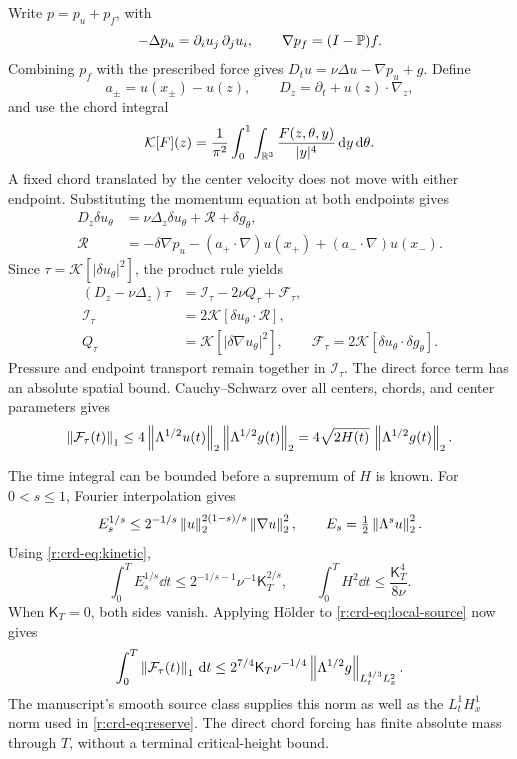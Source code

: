 Write \(p=p_u+p_f\), with
\[
 -\Delta p_u=\partial_i u_j\,\partial_j u_i,\qquad
 \nabla p_f=(I-\mathbb P)f.
\]
Combining \(p_f\) with the prescribed force gives
\(D_tu=\nu\Delta u-\nabla p_u+g\). Define
\[
 a_\pm=u(x_\pm)-u(z),\qquad
 D_z=\partial_t+u(z)\cdot\nabla_z,
\]
and use the chord integral
\[
 \mathcal K[F](z)=\frac1{\pi^2}\int_0^1\int_{\mathbb R^3}
             \frac{F(z,\theta,y)}{|y|^4}\,\mathrm d y\,\mathrm d\theta.
\]
A fixed chord translated by the center velocity does not move with either
endpoint. Substituting the momentum equation at both endpoints gives
\begin{equation}
 \begin{aligned}
 D_z\delta u_\theta&=\nu\Delta_z\delta u_\theta
                  +\mathcal R+\delta g_\theta,\\
 \mathcal R&=-\delta\nabla p_u
 -(a_+\cdot\nabla)u(x_+)+(a_-\cdot\nabla)u(x_-).
 \end{aligned}
 \label{r:crd-eq:chord-momentum}
\end{equation}
Since \(\tau=\mathcal K[|\delta u_\theta|^2]\), the product rule yields
\begin{equation}
 \begin{aligned}
 (D_z-\nu\Delta_z)\tau
   &=\mathcal I_\tau-2\nu Q_\tau+\mathcal F_\tau,\\
 \mathcal I_\tau&=2\mathcal K[\delta u_\theta\cdot\mathcal R],\\
 Q_\tau&=\mathcal K[|\delta\nabla u_\theta|^2],\qquad
 \mathcal F_\tau=2\mathcal K[\delta u_\theta\cdot\delta g_\theta].
 \end{aligned}
 \label{r:crd-eq:density}
\end{equation}
Pressure and endpoint transport remain together in \(\mathcal I_\tau\).
The direct force term has an absolute spatial bound. Cauchy--Schwarz
over all centers, chords, and center parameters gives
\begin{equation}
 \left\lVert \mathcal F_\tau(t)\right\rVert_1
 \le4\left\lVert \Lambda^{1/2}u(t)\right\rVert_2\left\lVert \Lambda^{1/2}g(t)\right\rVert_2
 =4\sqrt{2H(t)}\,\left\lVert \Lambda^{1/2}g(t)\right\rVert_2.
 \label{r:crd-eq:local-source}
\end{equation}

The time integral can be bounded before a supremum of \(H\) is known.
For \(0<s\le1\), Fourier interpolation gives
\[
 E_s^{1/s}\le
 2^{-1/s}\left\lVert u\right\rVert_2^{2(1-s)/s}\left\lVert \nabla u\right\rVert_2^2,
 \qquad E_s=\tfrac12\left\lVert \Lambda^su\right\rVert_2^2.
\]
Using \eqref{r:crd-eq:kinetic},
\begin{equation}
 \int_0^T E_s^{1/s}\dd t
 \le2^{-1/s-1}\nu^{-1}\mathsf K_T^{2/s},\qquad
 \int_0^T H^2\dd t\le\frac{\mathsf K_T^4}{8\nu}.
 \label{r:crd-eq:low-height}
\end{equation}
When \(\mathsf K_T=0\), both sides vanish. Applying H\"older to
\eqref{r:crd-eq:local-source} now gives
\begin{equation}
 \int_0^T\left\lVert \mathcal F_\tau(t)\right\rVert_1\,\mathrm d t
 \le2^{7/4}\mathsf K_T\nu^{-1/4}
       \left\lVert \Lambda^{1/2}g\right\rVert_{L^{4/3}_tL^2_x}.
 \label{r:crd-eq:local-source-budget}
\end{equation}
The manuscript's smooth source class supplies this norm as well as the
\(L^1_tH^1_x\) norm used in \eqref{r:crd-eq:reserve}.
The direct chord forcing has finite absolute mass through \(T\), without
a terminal critical-height bound.

